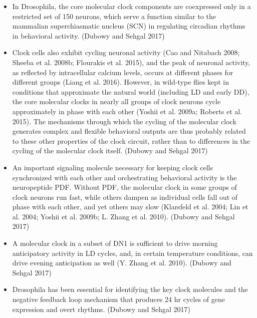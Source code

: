 \documentclass[11pt]{article}
\begin{document}
\begin{itemize}
    \item In Drosophila, the core molecular clock components are coexpressed only in a restricted
    set of 150 neurons, which serve a function similar to the mammalian superchiasmatic nucleus
    (SCN) in regulating circadian rhythms in behavioral activity.
    \cite{dubowyCircadianRhythmsSleep2017} (Dubowy and Sehgal 2017)

    \item Clock cells also exhibit cycling neuronal activity (Cao and Nitabach 2008; Sheeba et al.
    2008b; Flourakis et al. 2015), and the peak of neuronal activity, as reflected by intracellular 
    calcium levels, occurs at different phases for different groups (Liang et al. 2016). However, in 
    wild-type flies kept in conditions that approximate the natural world (including LD and early DD), 
    the core molecular clocks in nearly all groups of clock neurons cycle approximately in phase with 
    each other (Yoshii
    et al. 2009a; Roberts et al. 2015). The mechanisms through which the cycling of the molecular clock 
    generates complex and flexible behavioral outputs are thus probably related to these other properties
    of the clock circuit, rather than to differences in the cycling of the molecular clock itself.
    \cite{dubowyCircadianRhythmsSleep2017} (Dubowy and Sehgal 2017)

    \item An important signaling molecule necessary for keeping clock cells synchronized with each 
    other and orchestrating behavioral activity is the neuropeptide PDF.
    Without PDF, the molecular clock in some groups of clock neurons run fast, while others dampen 
    as individual cells fall out of phase with each other, and yet others may slow 
    (Klarsfeld et al. 2004; Lin et al. 2004; Yoshii et al. 2009b; L. Zhang et al. 2010).
    \cite{dubowyCircadianRhythmsSleep2017} (Dubowy and Sehgal 2017)


    \item A molecular clock in a subset of DN1 is sufficient to drive morning anticipatory activity
    in LD cycles, and, in certain temperature conditions, can drive evening anticipation as well 
    (Y. Zhang et al. 2010).
    \cite{dubowyCircadianRhythmsSleep2017} (Dubowy and Sehgal 2017)

    \item Drosophila has been essential for identifying the key clock molecules and the negative 
    feedback loop mechanism that produces 24 hr cycles of gene expression and overt rhythms.
    \cite{dubowyCircadianRhythmsSleep2017} (Dubowy and Sehgal 2017)


\end{itemize}
\end{document}
